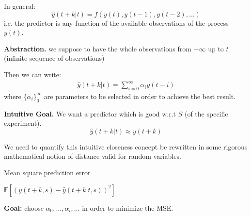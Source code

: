 In general: 
$$\hat{y}(t + k | t) = f ( y(t), y(t-1), y(t-2),\ldots)$$
i.e. the predictor is any function of the available observations of the 
process $y(t)$.

\textbf{Abstraction.} we suppose to have the whole observations from $-\infty$ up to $t$ (infinite sequence of observations)

Then we can write:
\begin{align*}
	\hat{y}(t + k | t)=\sum_{i=0}^{\infty}\alpha_i y(t-i)
\end{align*}
where ${\{\alpha_i\}}_0^\infty$ are parameters to be selected in order to achieve the best result.

\textbf{Intuitive Goal.} 
We want a predictor which is good w.r.t $S$ (of the specific experiment).
$$\hat{y}(t + k | t)\approx y(t+k) $$

We need to quantify this intuitive closeness concept be rewritten in 
some rigorous mathematical notion of distance valid for random variables.

\begin{definition}{Mean square prediction error}
	
	$\mathbb{E}[(y(t+k,s)-\hat{y}(t+k|t,s))^2]$
\end{definition}

\textbf{Goal:} choose $\alpha_0,\ldots,\alpha_i,\ldots$ in order to minimize the MSE.